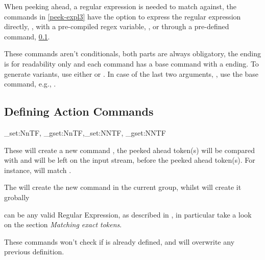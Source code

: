 \documentclass[10pt]{article}
\begin{document}
When peeking ahead, a regular expression is needed to match against, the commands in \ref{peek-expl3}  have the option to express the regular expression directly, , with a pre-compiled regex variable, ,  or through a pre-defined command, \ref{cmd-def-expl3}.
\begin{tsremark}
These commands aren't  conditionals, both  parts are always obligatory, the  ending is for readability only and each command has a base command with a  ending.  To generate variants, use either   or .
   In case of the last two arguments, , use the  base command, e.g., .
\end{tsremark}


\subsection{Defining Action Commands}\label{cmd-def-expl3}
 
\begin{codedescribe}[code,update=2025/10/07]{\xpeekahead_set:NnTF, \xpeekahead_gset:NnTF,\xpeekahead_set:NNTF, \xpeekahead_gset:NNTF}
\begin{codesyntax}%
\end{codesyntax}
These will create a new command , the peeked ahead token(s) will be compared with  and  will be left on the input stream, before the peeked ahead token(s). For instance,  will match \tsobj[xverb]{\begin{envx}}.

The  will create the new command in the current group, whilst   will create it grobally
\end{codedescribe}
\begin{tsremark}
   can be any valid Regular Expression, as described in \cite{expl3}, in particular take a look on the section \emph{Matching exact tokens}.
\end{tsremark}
\begin{tsremark}
  These commands won't check if  is already defined, and will overwrite any previous definition.
\end{tsremark}
\end{document}
